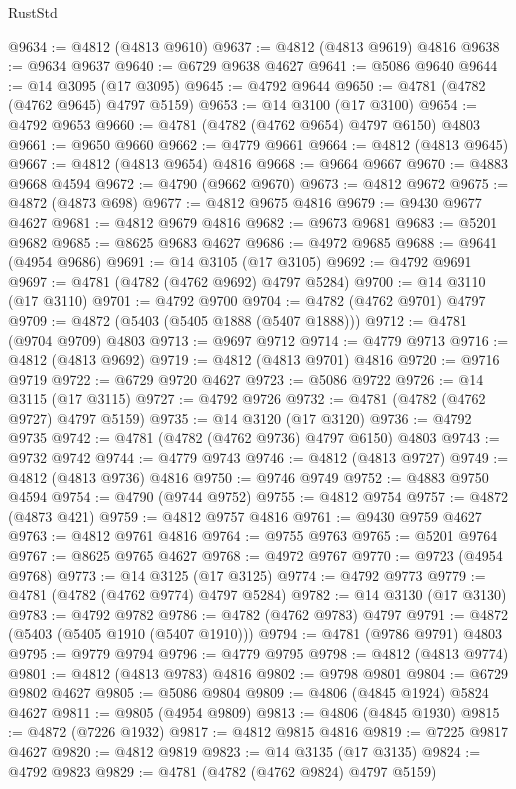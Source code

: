 \begin{lexlean}{RustStd}
\begin{coremodule}
@9634 := @4812 (@4813 @9610)
@9637 := @4812 (@4813 @9619) @4816
@9638 := @9634 @9637
@9640 := @6729 @9638 @4627
@9641 := @5086 @9640
@9644 := @14 @3095 (@17 @3095)
@9645 := @4792 @9644
@9650 := @4781 (@4782 (@4762 @9645) @4797 @5159)
@9653 := @14 @3100 (@17 @3100)
@9654 := @4792 @9653
@9660 := @4781 (@4782 (@4762 @9654) @4797 @6150) @4803
@9661 := @9650 @9660
@9662 := @4779 @9661
@9664 := @4812 (@4813 @9645)
@9667 := @4812 (@4813 @9654) @4816
@9668 := @9664 @9667
@9670 := @4883 @9668 @4594
@9672 := @4790 (@9662 @9670)
@9673 := @4812 @9672
@9675 := @4872 (@4873 @698)
@9677 := @4812 @9675 @4816
@9679 := @9430 @9677 @4627
@9681 := @4812 @9679 @4816
@9682 := @9673 @9681
@9683 := @5201 @9682
@9685 := @8625 @9683 @4627
@9686 := @4972 @9685
@9688 := @9641 (@4954 @9686)
@9691 := @14 @3105 (@17 @3105)
@9692 := @4792 @9691
@9697 := @4781 (@4782 (@4762 @9692) @4797 @5284)
@9700 := @14 @3110 (@17 @3110)
@9701 := @4792 @9700
@9704 := @4782 (@4762 @9701) @4797
@9709 := @4872 (@5403 (@5405 @1888 (@5407 @1888)))
@9712 := @4781 (@9704 @9709) @4803
@9713 := @9697 @9712
@9714 := @4779 @9713
@9716 := @4812 (@4813 @9692)
@9719 := @4812 (@4813 @9701) @4816
@9720 := @9716 @9719
@9722 := @6729 @9720 @4627
@9723 := @5086 @9722
@9726 := @14 @3115 (@17 @3115)
@9727 := @4792 @9726
@9732 := @4781 (@4782 (@4762 @9727) @4797 @5159)
@9735 := @14 @3120 (@17 @3120)
@9736 := @4792 @9735
@9742 := @4781 (@4782 (@4762 @9736) @4797 @6150) @4803
@9743 := @9732 @9742
@9744 := @4779 @9743
@9746 := @4812 (@4813 @9727)
@9749 := @4812 (@4813 @9736) @4816
@9750 := @9746 @9749
@9752 := @4883 @9750 @4594
@9754 := @4790 (@9744 @9752)
@9755 := @4812 @9754
@9757 := @4872 (@4873 @421)
@9759 := @4812 @9757 @4816
@9761 := @9430 @9759 @4627
@9763 := @4812 @9761 @4816
@9764 := @9755 @9763
@9765 := @5201 @9764
@9767 := @8625 @9765 @4627
@9768 := @4972 @9767
@9770 := @9723 (@4954 @9768)
@9773 := @14 @3125 (@17 @3125)
@9774 := @4792 @9773
@9779 := @4781 (@4782 (@4762 @9774) @4797 @5284)
@9782 := @14 @3130 (@17 @3130)
@9783 := @4792 @9782
@9786 := @4782 (@4762 @9783) @4797
@9791 := @4872 (@5403 (@5405 @1910 (@5407 @1910)))
@9794 := @4781 (@9786 @9791) @4803
@9795 := @9779 @9794
@9796 := @4779 @9795
@9798 := @4812 (@4813 @9774)
@9801 := @4812 (@4813 @9783) @4816
@9802 := @9798 @9801
@9804 := @6729 @9802 @4627
@9805 := @5086 @9804
@9809 := @4806 (@4845 @1924) @5824 @4627
@9811 := @9805 (@4954 @9809)
@9813 := @4806 (@4845 @1930)
@9815 := @4872 (@7226 @1932)
@9817 := @4812 @9815 @4816
@9819 := @7225 @9817 @4627
@9820 := @4812 @9819
@9823 := @14 @3135 (@17 @3135)
@9824 := @4792 @9823
@9829 := @4781 (@4782 (@4762 @9824) @4797 @5159)

\end{coremodule}
\end{lexlean}
